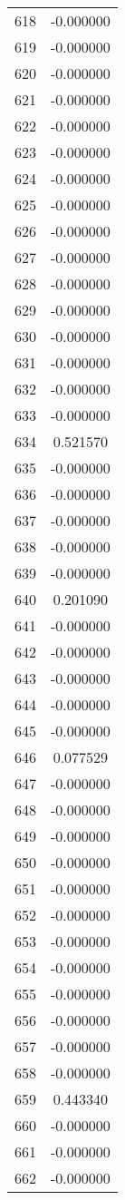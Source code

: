 \documentclass[12pt]{article}
\begin{document}
\begin{longtable}{@{}cc@{}}
618 & -0.000000 \\
619 & -0.000000 \\
620 & -0.000000 \\
621 & -0.000000 \\
622 & -0.000000 \\
623 & -0.000000 \\
624 & -0.000000 \\
625 & -0.000000 \\
626 & -0.000000 \\
627 & -0.000000 \\
628 & -0.000000 \\
629 & -0.000000 \\
630 & -0.000000 \\
631 & -0.000000 \\
632 & -0.000000 \\
633 & -0.000000 \\
634 & 0.521570 \\
635 & -0.000000 \\
636 & -0.000000 \\
637 & -0.000000 \\
638 & -0.000000 \\
639 & -0.000000 \\
640 & 0.201090 \\
641 & -0.000000 \\
642 & -0.000000 \\
643 & -0.000000 \\
644 & -0.000000 \\
645 & -0.000000 \\
646 & 0.077529 \\
647 & -0.000000 \\
648 & -0.000000 \\
649 & -0.000000 \\
650 & -0.000000 \\
651 & -0.000000 \\
652 & -0.000000 \\
653 & -0.000000 \\
654 & -0.000000 \\
655 & -0.000000 \\
656 & -0.000000 \\
657 & -0.000000 \\
658 & -0.000000 \\
659 & 0.443340 \\
660 & -0.000000 \\
661 & -0.000000 \\
662 & -0.000000 \\

\end{longtable}
\end{document}
